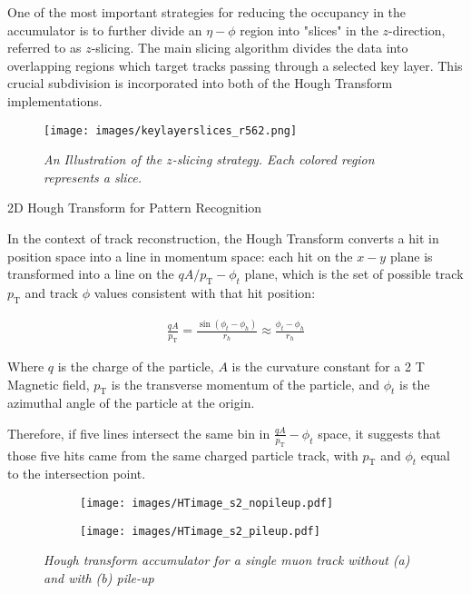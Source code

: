 \documentclass[final]{beamer}
\newlength{\colwidth}
\begin{document}
\begin{frame}[t]
\begin{columns}[t]
\begin{column}{\colwidth}
    One of the most important strategies for reducing the occupancy in the accumulator is to further divide an $\eta-\phi$ region 
    into "slices" in the $z$-direction, referred to as $z$-slicing. The main slicing algorithm divides the data into overlapping regions which target tracks 
    passing through a selected key layer. This crucial subdivision is incorporated into both of the Hough Transform implementations.

    \begin{figure}
      \centering
      \texttt{[image: images/keylayerslices\_r562.png]}
      \caption*{\emph{An Illustration of the $z$-slicing strategy. Each colored region represents a slice.}}
    \end{figure}

  \begin{block}{2D Hough Transform for Pattern Recognition}

    In the context of track reconstruction, the Hough Transform converts a hit in position space into a line in momentum space: each hit on 
    the $x-y$ plane is transformed into a line on the $qA/p_\text{T}-\phi_t$ plane, which is the set of possible track $p_\text{T}$ and track $\phi$ 
    values consistent with that hit position:
   
    \begin{align*}
      \frac{qA}{p_\text{T}} = \frac{\sin(\phi_t - \phi_h)}{r_h} \approx \frac{\phi_t - \phi_h}{r_h}
    \end{align*}

    Where $q$ is the charge of the particle, $A$ is the curvature constant for a 2 T Magnetic field, $p_\text{T}$ is the transverse 
    momentum of the particle, and $\phi_t$ is the azimuthal angle of the particle at the origin.

    Therefore, if five lines intersect the same bin in $\frac{qA}{p_\text{T}}-\phi_t$ space, it suggests that those five hits came from the same charged
    particle track, with $p_\text{T}$ and $\phi_t$ equal to the intersection point.


    \begin{figure}[!h]
      \centering
      \begin{subfigure}[t]{.45\textwidth}
          \centering
          \texttt{[image: images/HTimage\_s2\_nopileup.pdf]}
          \caption{}
      \end{subfigure}
      \begin{subfigure}[t]{.45\textwidth}
         \centering
         \texttt{[image: images/HTimage\_s2\_pileup.pdf]}
         \caption{}
      \end{subfigure}
      \caption*{\emph{Hough transform accumulator for a single muon track without (a) and with (b) pile-up}}
    \end{figure}
  

\end{block}
\end{column}
\end{columns}
\end{frame}
\end{document}
